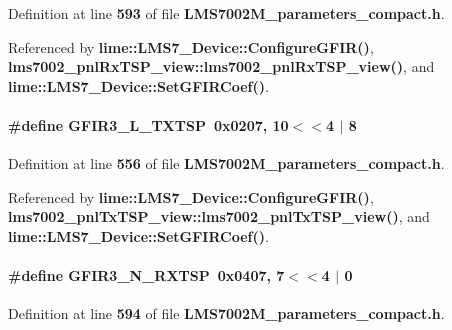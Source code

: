 Definition at line {\bf 593} of file {\bf L\+M\+S7002\+M\+\_\+parameters\+\_\+compact.\+h}.



Referenced by {\bf lime\+::\+L\+M\+S7\+\_\+\+Device\+::\+Configure\+G\+F\+I\+R()}, {\bf lms7002\+\_\+pnl\+Rx\+T\+S\+P\+\_\+view\+::lms7002\+\_\+pnl\+Rx\+T\+S\+P\+\_\+view()}, and {\bf lime\+::\+L\+M\+S7\+\_\+\+Device\+::\+Set\+G\+F\+I\+R\+Coef()}.

\paragraph[{G\+F\+I\+R3\+\_\+\+L\+\_\+\+T\+X\+T\+SP}]{\setlength{\rightskip}{0pt plus 5cm}\#define G\+F\+I\+R3\+\_\+\+L\+\_\+\+T\+X\+T\+SP~0x0207, 10$<$$<$4 $\vert$  8}\label{LMS7002M__parameters__compact_8h_ac8c08b598576c07caf5fcedf3a4185b6}


Definition at line {\bf 556} of file {\bf L\+M\+S7002\+M\+\_\+parameters\+\_\+compact.\+h}.



Referenced by {\bf lime\+::\+L\+M\+S7\+\_\+\+Device\+::\+Configure\+G\+F\+I\+R()}, {\bf lms7002\+\_\+pnl\+Tx\+T\+S\+P\+\_\+view\+::lms7002\+\_\+pnl\+Tx\+T\+S\+P\+\_\+view()}, and {\bf lime\+::\+L\+M\+S7\+\_\+\+Device\+::\+Set\+G\+F\+I\+R\+Coef()}.

\paragraph[{G\+F\+I\+R3\+\_\+\+N\+\_\+\+R\+X\+T\+SP}]{\setlength{\rightskip}{0pt plus 5cm}\#define G\+F\+I\+R3\+\_\+\+N\+\_\+\+R\+X\+T\+SP~0x0407, 7$<$$<$4 $\vert$  0}\label{LMS7002M__parameters__compact_8h_a8ab23814e5d14be3042f333797f55957}


Definition at line {\bf 594} of file {\bf L\+M\+S7002\+M\+\_\+parameters\+\_\+compact.\+h}.



